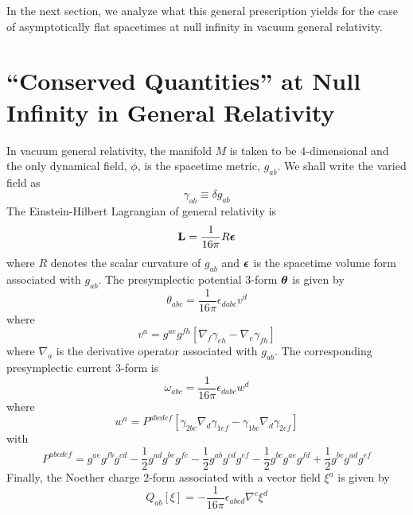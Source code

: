In the next section, we analyze what this general prescription yields
for the case of asymptotically flat spacetimes at null infinity in
vacuum general relativity.


\section{``Conserved Quantities'' at Null Infinity in General Relativity}

In vacuum general relativity, the manifold $M$ is taken to be
$4$-dimensional and the only dynamical field, $\phi$, is the spacetime
metric, $g_{ab}$. We shall write the varied field as
\begin{equation}
\gamma_{ab} \equiv \delta g_{ab}
\label{gamma}
\end{equation}
The Einstein-Hilbert Lagrangian of general relativity is
\begin{equation}
{\bf L} = \frac{1}{16 \pi} R {\mbox{\boldmath $\epsilon$}}
\label{Lgr}
\end{equation}
where $R$ denotes the scalar curvature of $g_{ab}$ and
${\mbox{\boldmath $\epsilon$}}$ is the spacetime volume form
associated with $g_{ab}$.  The presymplectic potential $3$-form
${\mbox{\boldmath $\theta$}}$ is given by
\begin{equation}
\theta_{abc} = \frac{1}{16 \pi} \epsilon_{dabc} v^d
\label{thetagr}
\end{equation}
where
\begin{equation}
v^a = g^{ae} g^{fh} [\nabla_f \gamma_{eh} - \nabla_e \gamma_{fh}]
\label{v}
\end{equation}
where $\nabla_a$ is the derivative operator associated with $g_{ab}$.
The corresponding presymplectic current $3$-form is \cite{bw}
\begin{equation}
\omega_{abc} = \frac{1}{16 \pi} \epsilon_{dabc} w^d
\label{omegagr}
\end{equation}
where
\begin{equation}
w^a = P^{abcdef}[\gamma_{2bc} \nabla_d \gamma_{1ef} - \gamma_{1bc}
\nabla_d \gamma_{2ef} ]
\label{w}
\end{equation}
with
\begin{equation}
P^{abcdef} = g^{ae}g^{fb}g^{cd} - \frac{1}{2}g^{ad}g^{be}g^{fc}
- \frac{1}{2}g^{ab}g^{cd}g^{ef} - \frac{1}{2}g^{bc}g^{ae}g^{fd} +
\frac{1}{2}g^{bc}g^{ad}g^{ef}
\label{P}
\end{equation}
Finally, the Noether charge $2$-form associated with a vector field
$\xi^a$ is given by \cite{iw}
\begin{equation}
Q_{ab}[\xi] = - \frac{1}{16 \pi} \epsilon_{abcd} \nabla^c \xi^d
\label{Qgr}
\end{equation}

